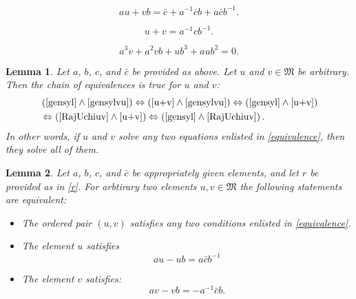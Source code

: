 \documentclass[10pt,a4paper]{amsart}
\newtheorem{lemma}{Lemma}
\def\M{\mathfrak{M}}
\begin{document}
\begin{equation}\label{gensylvu}
au+vb=\bar{c}+a^{-1}\bar{c}b+a\bar{c}b^{-1}.
\end{equation}

 \begin{equation}\label{u+v}
u+v=a^{-1}cb^{-1}.
\end{equation}

 \begin{equation}\label{RajUchiuv}
a^3v+a^2vb+ub^3+aub^2=0.
\end{equation}

\begin{lemma}\label{2of4} Let $a$, $b$, $c$, and $\bar{c}$ be provided as above. Let $u$ and $v\in\M$ be arbitrary. Then the chain of equivalences is true for $u$ and $v$:
\begin{eqnarray}
\label{equivalence}
\begin{aligned}
&\left(\eqref{gensyl}\wedge\eqref{gensylvu}\right)\Leftrightarrow\left(\eqref{u+v}\wedge\eqref{gensylvu}\right)\Leftrightarrow\left(\eqref{gensyl}\wedge\eqref{u+v}\right)\\
&\Leftrightarrow\left(\eqref{RajUchiuv}\wedge\eqref{u+v}\right)\Leftrightarrow\left(\eqref{gensyl}\wedge\eqref{RajUchiuv}\right).
\end{aligned}
\end{eqnarray} 
In other words, if $u$ and $v$ solve any two equations enlisted in \eqref{equivalence}, then they solve all of them.
\end{lemma}

 \begin{lemma}\label{uvsyl}
Let $a$, $b$, $c$, and $\bar{c}$ be appropriately given elements, and let $r$ be provided as in \eqref{r}. For arbtirary two elements $u,v\in\M$ the following statements are equivalent: 
\begin{itemize}
\item[(a)] The ordered pair $(u,v)$ satisfies any two conditions enlisted in \eqref{equivalence}.
\item[(b)] The element $u$ satisfies
\begin{equation}
\label{auub}
au-ub=a\bar{c}b^{-1}\end{equation}
\item[(c)] The element $v$ satisfies:
\begin{equation}\label{avvb}
av-vb=-a^{-1}\bar{c}b.
\end{equation}
\end{itemize}
\end{lemma}
\end{document}
